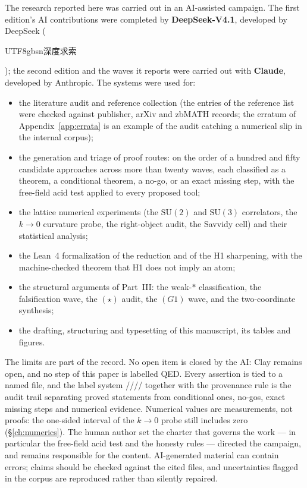 The research reported here was carried out in an AI-assisted campaign. The first edition's AI
contributions were completed by \textbf{DeepSeek-V4.1}, developed by DeepSeek
(\begin{CJK}{UTF8}{gbsn}深度求索\end{CJK}); the second edition and the waves it reports were
carried out with \textbf{Claude}, developed by Anthropic. The systems were used for:

\begin{itemize}
\item the literature audit and reference collection (the entries of the reference list were
  checked against publisher, arXiv and zbMATH records; the erratum of Appendix~\ref{app:errata}
  is an example of the audit catching a numerical slip in the internal corpus);
\item the generation and triage of proof routes: on the order of a hundred and fifty candidate
  approaches across more than twenty waves, each classified as a theorem, a conditional theorem,
  a no-go, or an exact missing step, with the free-field acid test applied to every proposed tool;
\item the lattice numerical experiments (the $\mathrm{SU}(2)$ and $\mathrm{SU}(3)$ correlators,
  the $k\to0$ curvature probe, the right-object audit, the Savvidy cell) and their statistical
  analysis;
\item the Lean~4 formalization of the reduction and of the H1 sharpening, with the machine-checked
  theorem that H1 does not imply an atom;
\item the structural arguments of Part~III: the weak-$*$ classification, the falsification wave,
  the $(\star)$ audit, the $(G1)$ wave, and the two-coordinate synthesis;
\item the drafting, structuring and typesetting of this manuscript, its tables and figures.
\end{itemize}

The limits are part of the record. No open item is closed by the AI: Clay remains open, and no
step of this paper is labelled QED. Every assertion is tied to a named file, and the label
system \LT/\LC/\LN/\LM/\LE{} together with the provenance rule is the audit trail separating
proved statements from conditional ones, no-gos, exact missing steps and numerical evidence.
Numerical values are measurements, not proofs: the one-sided interval of the $k\to0$ probe still
includes zero (\S\ref{ch:numerics}). The human author set the charter that governs the work ---
in particular the free-field acid test and the honesty rules --- directed the campaign, and
remains responsible for the content. AI-generated material can contain errors; claims should be
checked against the cited files, and uncertainties flagged in the corpus are reproduced rather
than silently repaired.
